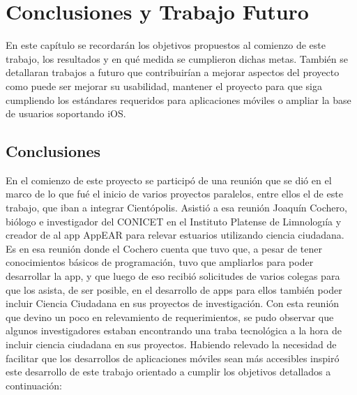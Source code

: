 \chapter{Conclusiones y Trabajo Futuro}

En este capítulo se recordarán los objetivos propuestos al comienzo de este trabajo, los resultados y en qué medida se cumplieron dichas metas. También se detallaran trabajos a futuro que contribuirían a mejorar aspectos del proyecto como puede ser mejorar su usabilidad, mantener el proyecto para que siga cumpliendo los estándares requeridos para aplicaciones móviles o ampliar la base de usuarios soportando iOS.

\section{Conclusiones}

En el comienzo de este proyecto se participó de una reunión que se dió en el marco de lo que fué el inicio de varios proyectos paralelos, entre ellos el de este trabajo, que iban a integrar Cientópolis. Asistió a esa reunión Joaquín Cochero, biólogo e investigador del CONICET en el Instituto Platense de Limnologıía y creador de al app AppEAR para relevar estuarios utilizando ciencia ciudadana. Es en esa reunión donde el Cochero cuenta que tuvo que, a pesar de tener conocimientos básicos de programación, tuvo que ampliarlos para poder desarrollar la app, y que luego de eso recibió solicitudes de varios colegas para que los asista, de ser posible, en el desarrollo de apps para ellos también poder incluir Ciencia Ciudadana en sus proyectos de investigación. Con esta reunión que devino un poco en relevamiento de requerimientos, se pudo observar que algunos investigadores estaban encontrando una traba tecnológica a la hora de incluir ciencia ciudadana en sus proyectos.
Habiendo relevado la necesidad de facilitar que los desarrollos de aplicaciones móviles sean más accesibles inspiró este desarrollo de este trabajo orientado a cumplir los objetivos detallados a continuación:


